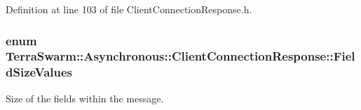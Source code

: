 Definition at line 103 of file Client\-Connection\-Response.\-h.

\hypertarget{class_terra_swarm_1_1_asynchronous_1_1_client_connection_response_a059519ab548bdfbe546b4583c5174fe1}{
\subsubsection[{Field\-Size\-Values}]{\setlength{\rightskip}{0pt plus 5cm}enum {\bf Terra\-Swarm\-::\-Asynchronous\-::\-Client\-Connection\-Response\-::\-Field\-Size\-Values}\hspace{0.3cm}{\ttfamily [private]}}}\label{class_terra_swarm_1_1_asynchronous_1_1_client_connection_response_a059519ab548bdfbe546b4583c5174fe1}


Size of the fields within the message. 

